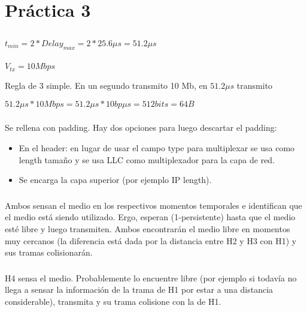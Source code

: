 \section{Práctica 3}

\subsection{}

\subsubsection{}
$t_{min} = 2 * Delay_{max} = 2 * 25.6 \mu s = 51.2 \mu s$

\subsubsection{}
$V_{tx} = 10 Mbps$

Regla de 3 simple. En un segundo transmito 10 Mb, en $51.2 \mu s$ transmito

$51.2 \mu s * 10Mbps = 51.2 \mu s * 10bp \mu s = 512bits = 64B$

\subsubsection{}
Se rellena con padding. Hay dos opciones para luego descartar el padding:

\begin{itemize}
\item En el header: en lugar de usar el campo type para multiplexar se usa como length tamaño y se usa LLC como multiplexador para la capa de red.
\item Se encarga la capa superior (por ejemplo IP length).
\end{itemize}

\subsubsection{}
Ambos sensan el medio en los respectivos momentos temporales e identifican que el medio está siendo utilizado. Ergo, esperan (1-persistente) hasta que el medio esté libre y luego transmiten. Ambos encontrarán el medio libre en momentos muy cercanos (la diferencia está dada por la distancia entre H2 y H3 con H1) y sus tramas colisionarán.

\subsubsection{}
H4 sensa el medio. Probablemente lo encuentre libre (por ejemplo si todavía no llega a sensar la información de la trama de H1 por estar a una distancia considerable), transmita y su trama colisione con la de H1.

